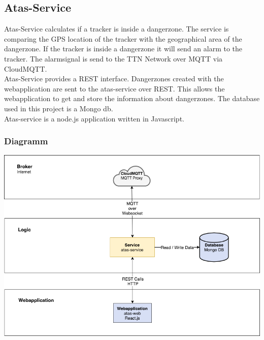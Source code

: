 \documentclass[a4paper,11pt, oneside]{report}
\theoremstyle{definition}
\begin{document}
\subsection{Atas-Service}
Atas-Service calculates if a tracker is inside a dangerzone. The service is comparing the GPS location of the tracker with the geographical area of the dangerzone. If the tracker is inside a dangerzone it will send an alarm to the tracker. The alarmsignal is send to the TTN Network over MQTT via CloudMQTT.\\[0.3cm]
Atas-Service provides a REST interface. Dangerzones created with the webapplication are sent to the atas-service over REST. This allows the webapplication to get and store the information about dangerzones. The database used in this project is a Mongo db.\\[0.3cm]
Atas-service is a node.js application written in Javascript.
\subsubsection{Diagramm}
\includegraphics[width=\textwidth]{img/ATAS_SystemOverview_Detail_atasservice.png}
\end{document}
